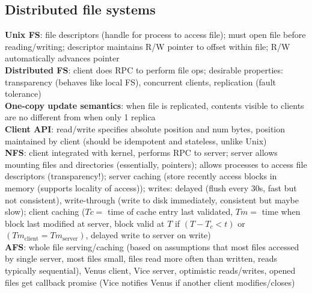 \documentclass{article}
\begin{document}
\begin{multicols*}{3}
\section{Distributed file systems}
\textbf{Unix FS}: file descriptors (handle for process to access file); must open file before reading/writing; descriptor maintains R/W pointer to offset within file; R/W automatically advances pointer \\
\textbf{Distributed FS}: client does RPC to perform file ops; desirable properties: transparency (behaves like local FS), concurrent clients, replication (fault tolerance) \\
\textbf{One-copy update semantics}: when file is replicated, contents visible to clients are no different from when only 1 replica \\
\textbf{Client API}: read/write specifies absolute position and num bytes, position maintained by client (should be idempotent and stateless, unlike Unix) \\
\textbf{NFS}: client integrated with kernel, performs RPC to server; server allows mounting files and directories (essentially, pointers); allows processes to access file descriptors (transparency!); server caching (store recently access blocks in memory (supports locality of access)); writes: delayed (flush every 30s, fast but not consistent), write-through (write to disk immediately, consistent but maybe slow); client caching ($Tc =$ time of cache entry last validated, $Tm =$ time when block last modified at server, block valid at $T$ if $(T-T_c < t)$ or $(Tm_{\text{client}} = Tm_{\text{server}})$, delayed write to server on write) \\
\textbf{AFS}: whole file serving/caching (based on assumptions that most files accessed by single server, most files small, files read more often than written, reads typically sequential), Venus client, Vice server, optimistic reads/writes, opened files get callback promise (Vice notifies Venus if another client modifies/closes)


\end{multicols*}
\end{document}
